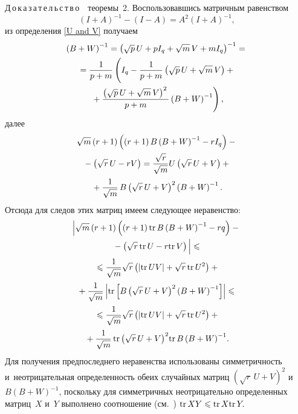 \begin{multicols}{2}
\noindent
Д\,о\,к\,а\,з\,а\,т\,е\,л\,ь\,с\,т\,в\,о\ \ теоремы~2.
Воспользовавшись матричным равенством
\begin{equation*}
\left(I+A\right)^{-1}-\left(I-A\right)=A^{2}\left(I+A\right)^{-1},
\end{equation*}
из определения \eqref{U and V} получаем
\begin{multline*}
\left(B+W\right)^{-1}=\left(\sqrt{p}\,U+pI_{q}+\sqrt{m}\,V+mI_{q}\right)^{-1}={}\\
{}=\fr{1}{p+m}\left(
\vphantom{\fr{\left(\sqrt{p}\,U+\sqrt{m}\,V\right)^{2}}
{p+m}}
I_{q}-
\fr{1}{p+m}\left(\sqrt{p}\,U+\sqrt{m}\,V\right)+{}\right.\\
\left.{}+\fr{\left(\sqrt{p}\,U+\sqrt{m}\,V\right)^{2}}
{p+m}\left(B+W\right)^{-1}\right),
\end{multline*}
далее
\begin{multline*}
\sqrt{m}\left(r+1\right)\left(\left(r+1\right)B\left(B+W\right)^{-1}-
rI_{q}\right)-{}\\
{}-\left(\sqrt{r}\,U-rV\right)=\displaystyle\frac{\displaystyle \sqrt{r}\mathstrut}{\displaystyle \sqrt{m}\mathstrut}U\left(\sqrt{r}\,U+V\right)+{}\\
{}+
        \displaystyle\frac{\displaystyle 1\mathstrut}{\displaystyle \sqrt{m}\mathstrut}\,B\left(\sqrt{r}\,U+V\right)^{2}\left(B+W\right)^{-1}.
\end{multline*}
Отсюда для следов этих матриц имеем следующее неравенство:
\begin{multline}
\label{trBW}
\left|\sqrt{m}\left(r+1\right)\left(\left(r+1\right)\mathrm{tr}\,{B\left(B+W\right)^{-1}}-
rq\right)-{}\right.\\
\left.{}-\left(\sqrt{r}\,\mathrm{tr}\,{U}-r\mathrm{tr}\,{V}\right)
\vphantom{\left(W\right)^{-1}}
\right|
\leqslant{}\\
{}\leqslant \fr{1}{\sqrt{m}}\sqrt{r}\left(\left|\mathrm{tr}\,{UV}\right|+\sqrt{r}\,\mathrm{tr}\,{U^{2}}\right)+{}\\
{}+
\fr{1}{\sqrt{m}}\left|\mathrm{tr}\,{\left[B\left(\sqrt{r}\,U+V\right)^{2}\left(B+W\right)^{-1}\right]}
\right|\leqslant{}\\
{}\leqslant
\fr{1}{\sqrt{m}}\sqrt{r}\left(\left|\mathrm{tr}\,{UV}\right|+\sqrt{r}\,\mathrm{tr}\,{U^{2}}\right)+{}\\
{}+
\fr{1}{\sqrt{m}}\,\mathrm{tr}\,{\left(\sqrt{r}\,U+V\right)^{2}}\mathrm{tr}\,{B\left(B+W\right)^{-1}}.
\end{multline}
Для получения предпоследнего неравенства использованы симметричность 
и~неотрицательная определенность обеих случайных матриц 
$\left(\sqrt{r}\,U+V\right)^{2}$ и~$B\left(B+W\right)^{-1}$, поскольку для 
сим\-мет\-рич\-ных неотрицательно определенных матриц~$X$ и~$Y$ выполнено   
соотношение (см.~\cite{lit:TraceIneq})
$\mathrm{tr}\,{XY}\hm\leqslant\mathrm{tr}\,{X}\mathrm{tr}\,{Y}.$


\end{multicols}
